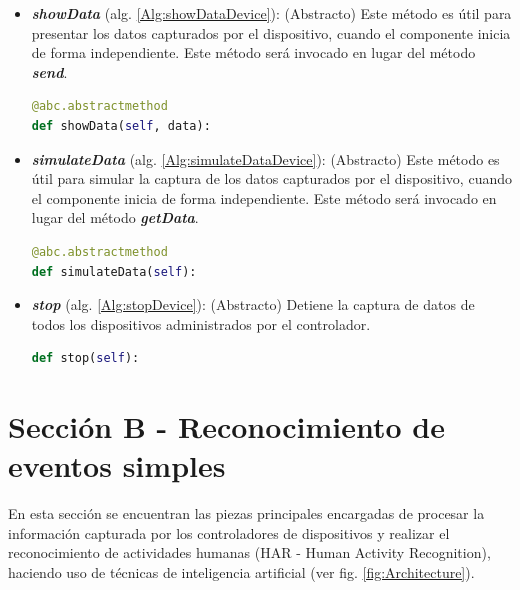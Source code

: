         \begin{itemize}
            
            \item \textbf{\textit{showData}} (alg. \ref{Alg:showDataDevice}):
            (Abstracto) Este método es útil para presentar los datos capturados por el dispositivo, cuando el componente inicia de forma independiente. Este método será invocado en lugar del método \textbf{\textit{send}}.
            
            \begin{lstlisting}[language=Python, caption={Firma del método ``\textit{showData}''.}, label=Alg:showDataDevice, numbers=none]
@abc.abstractmethod
def showData(self, data):
            \end{lstlisting}
            
            \item \textbf{\textit{simulateData}} (alg. \ref{Alg:simulateDataDevice}):
            (Abstracto) Este método es útil para simular la captura de los datos capturados por el dispositivo, cuando el componente inicia de forma independiente. Este método será invocado en lugar del método \textbf{\textit{getData}}.
            
            \begin{lstlisting}[language=Python, caption={Firma del método ``\textit{simulateData}''.}, label=Alg:simulateDataDevice, numbers=none]
@abc.abstractmethod
def simulateData(self):
            \end{lstlisting}
            
            \item \textbf{\textit{stop}} (alg. \ref{Alg:stopDevice}):
            (Abstracto) Detiene la captura de datos de todos los dispositivos administrados por el controlador. 
            \begin{lstlisting}[language=Python, caption={Firma del método ``\textit{stop}''.}, label=Alg:stopDevice, numbers=none]
def stop(self):
            \end{lstlisting}
            
        \end{itemize}
    
    \newpage

\section{Sección B - Reconocimiento de eventos simples}
\label{Sec:HAR}
    En esta sección se encuentran las piezas principales encargadas de procesar la información capturada por los controladores de dispositivos y realizar el reconocimiento de actividades humanas (HAR - Human Activity Recognition), haciendo uso de técnicas de inteligencia artificial (ver fig. \ref{fig:Architecture}).
    
